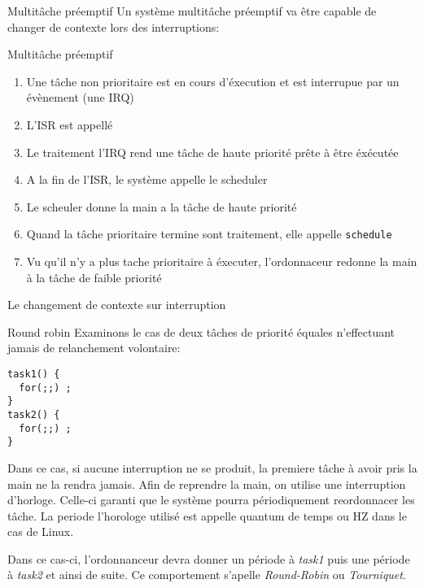 \begin{frame}{Multitâche préemptif}
  Un  système  multitâche préemptif  va  être  capable  de changer  de
  contexte lors des interruptions:
  \begin{center}
  \end{center}
\end{frame}

\begin{frame}{Multitâche préemptif}
  \begin{enumerate} 
  \item  Une tâche  non prioritaire  est en  cours d'éxecution  et est
    interrupue par un évènement (une IRQ)
  \item L'ISR est appellé
  \item Le traitement  l'IRQ rend une tâche de  haute priorité prête à
    être éxécutée
  \item A la fin de l'ISR, le système appelle le scheduler
  \item Le scheuler donne la main a la tâche de haute priorité
  \item  Quand  la tâche  prioritaire  termine  sont traitement,  elle
    appelle \texttt{schedule}
  \item   Vu  qu'il  n'y   a  plus   tache  prioritaire   à  éxecuter,
    l'ordonnaceur redonne la main à la tâche de faible priorité
  \end{enumerate} 
\end{frame} 

\begin{frame}{Le changement de contexte sur interruption}
  \begin{center}
  \end{center}
\end{frame} 

\begin{frame}[fragile]{Round robin}
  Examinons  le cas de  deux tâches  de priorité  équales n'effectuant
  jamais de relanchement volontaire:
  \begin{lstlisting} 
task1() {
  for(;;) ;
}
task2() {
  for(;;) ;
}
  \end{lstlisting} 

  Dans ce cas, si aucune interruption ne se produit, la premiere tâche
  à avoir pris la main ne la rendra jamais. Afin de reprendre la main,
  on  utilise une  interruption  d'horloge.  Celle-ci  garanti que  le
  système  pourra périodiquement  reordonnacer les  tâche.  La periode
  l'horologe utilisé est appelle quantum de temps ou HZ dans le cas de
  Linux.

  Dans   ce  cas-ci,   l'ordonnanceur  devra   donner  un   période  à
  \emph{task1} puis une période à  \emph{task2} et ainsi de suite.  Ce
  comportement s'apelle \emph{Round-Robin} ou \emph{Tourniquet}.
\end{frame} 

